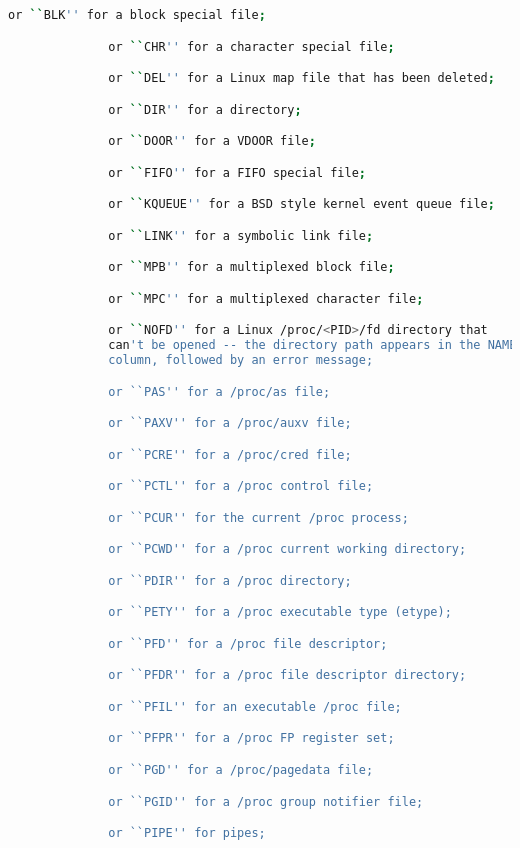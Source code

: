 {{\begin{lstlisting}[language=bash]
              or ``BLK'' for a block special file;

              or ``CHR'' for a character special file;

              or ``DEL'' for a Linux map file that has been deleted;

              or ``DIR'' for a directory;

              or ``DOOR'' for a VDOOR file;

              or ``FIFO'' for a FIFO special file;

              or ``KQUEUE'' for a BSD style kernel event queue file;

              or ``LINK'' for a symbolic link file;

              or ``MPB'' for a multiplexed block file;

              or ``MPC'' for a multiplexed character file;

              or ``NOFD'' for a Linux /proc/<PID>/fd directory that
              can't be opened -- the directory path appears in the NAME
              column, followed by an error message;

              or ``PAS'' for a /proc/as file;

              or ``PAXV'' for a /proc/auxv file;

              or ``PCRE'' for a /proc/cred file;

              or ``PCTL'' for a /proc control file;

              or ``PCUR'' for the current /proc process;

              or ``PCWD'' for a /proc current working directory;

              or ``PDIR'' for a /proc directory;

              or ``PETY'' for a /proc executable type (etype);

              or ``PFD'' for a /proc file descriptor;

              or ``PFDR'' for a /proc file descriptor directory;

              or ``PFIL'' for an executable /proc file;

              or ``PFPR'' for a /proc FP register set;

              or ``PGD'' for a /proc/pagedata file;

              or ``PGID'' for a /proc group notifier file;

              or ``PIPE'' for pipes;


\end{lstlisting}}}
